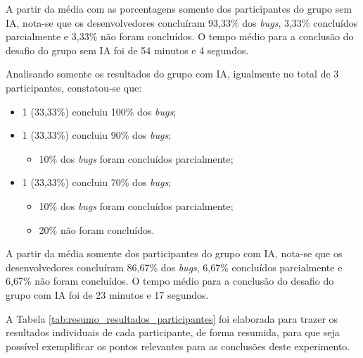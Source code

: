 \documentclass[english,brazilian]{UNISINOSartigo} %
\begin{document}
A partir da média com as porcentagens somente dos participantes do grupo sem IA, nota-se que os desenvolvedores concluíram 93,33\% dos \textit{bugs}, 3,33\% concluídos parcialmente e 3,33\% não foram concluídos. O tempo médio para a conclusão do desafio do grupo sem IA foi de 54 minutos e 4 segundos.

Analisando somente os resultados do grupo com IA, igualmente no total de 3 participantes, constatou-se que:

\begin{itemize}[leftmargin=1cm, itemsep=0.1em, topsep=0.1em]
    \item 1 (33,33\%) concluiu 100\% dos \textit{bugs};
    \item 1 (33,33\%) concluiu 90\% dos \textit{bugs};
    \begin{itemize}[leftmargin=1.2cm, itemsep=0.1em, topsep=0.1em]
        \item 10\% dos \textit{bugs} foram concluídos parcialmente;
    \end{itemize}
    \item 1 (33,33\%) concluiu 70\% dos \textit{bugs};
    \begin{itemize}[leftmargin=1.2cm, itemsep=0.1em, topsep=0.1em]
        \item 10\% dos \textit{bugs} foram concluídos parcialmente;
        \item 20\% não foram concluídos.
    \end{itemize}
\end{itemize}

A partir da média somente dos participantes do grupo com IA, nota-se que os desenvolvedores concluíram 86,67\% dos \textit{bugs}, 6,67\% concluídos parcialmente e 6,67\% não foram concluídos. O tempo médio para a conclusão do desafio do grupo com IA foi de 23 minutos e 17 segundos.

A Tabela \ref{tab:resumo_resultados_participantes} foi elaborada para trazer os resultados individuais de cada participante, de forma resumida, para que seja possível exemplificar os pontos relevantes para as conclusões deste experimento.
\end{document}

